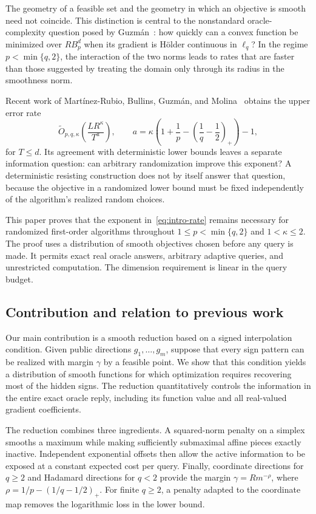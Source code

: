 \documentclass[11pt,a4paper]{article}
\theoremstyle{definition}
\theoremstyle{remark}
\newcommand{\tO}{\widetilde O}
\begin{document}
The geometry of a feasible set and the geometry in which an objective is
smooth need not coincide. This distinction is central to the nonstandard
oracle-complexity question posed by Guzm\'an~\cite{Guz15}: how quickly can a
convex function be minimized over $RB_p^d$ when its gradient is H\"older
continuous in $\ell_q$? In the regime $p<\min\{q,2\}$, the interaction of the
two norms leads to rates that are faster than those suggested by treating the
domain only through its radius in the smoothness norm.

Recent work of Mart\'inez-Rubio, Bullins, Guzm\'an, and
Molina~\cite{MBGM26} obtains the upper error rate
\begin{equation}\label{eq:intro-rate}
  \tO_{p,q,\kappa}\!\left(\frac{LR^\kappa}{T^a}\right),
  \qquad
  a=\kappa\left(1+\frac1p-
                 \left(\frac1q-\frac12\right)_+\right)-1,
\end{equation}
for $T\le d$. Its agreement with deterministic lower bounds leaves a separate
information question: can arbitrary randomization improve this exponent?
A deterministic resisting construction does not by itself answer that
question, because the objective in a randomized lower bound must be fixed
independently of the algorithm's realized random choices.

This paper proves that the exponent in~\eqref{eq:intro-rate} remains necessary
for randomized first-order algorithms throughout
$1\le p<\min\{q,2\}$ and $1<\kappa\le2$. The proof uses a distribution of
smooth objectives chosen before any query is made. It permits exact real
oracle answers, arbitrary adaptive queries, and unrestricted computation.
The dimension requirement is linear in the query budget.

\subsection{Contribution and relation to previous work}

Our main contribution is a smooth reduction based on a signed interpolation
condition. Given public directions $g_1,\ldots,g_m$, suppose that every sign
pattern can be realized with margin $\gamma$ by a feasible point. We show that
this condition yields a distribution of smooth functions for which optimization
requires recovering most of the hidden signs. The reduction quantitatively
controls the information in the entire exact oracle reply, including its
function value and all real-valued gradient coefficients.

The reduction combines three ingredients. A squared-norm penalty on a simplex
smooths a maximum while making sufficiently submaximal affine pieces exactly
inactive. Independent exponential offsets then allow the active information
to be exposed at a constant expected cost per query. Finally, coordinate
directions for $q\ge2$ and Hadamard directions for $q<2$ provide the margin
$\gamma=Rm^{-\rho}$, where
$\rho=1/p-(1/q-1/2)_+$. For finite $q\ge2$, a penalty adapted to the coordinate
map removes the logarithmic loss in the lower bound.
\end{document}
